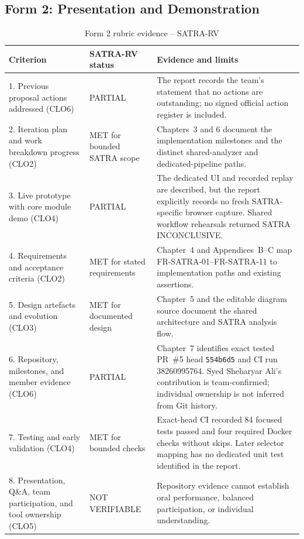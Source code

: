 \subsection{Form 2: Presentation and Demonstration}
\small
\begin{longtable}{p{}p{}p{}}
\caption{Form 2 rubric evidence -- SATRA-RV}\\
\toprule
\textbf{Criterion} & \textbf{SATRA-RV status} & \textbf{Evidence and limits}\\
\midrule
1. Previous proposal actions addressed (CLO6) & PARTIAL & The report records the team's statement that no actions are outstanding; no signed official action register is included.\\
2. Iteration plan and work breakdown progress (CLO2) & MET for bounded SATRA scope & Chapters~3 and 6 document the implementation milestones and the distinct shared-analyzer and dedicated-pipeline paths.\\
3. Live prototype with core module demo (CLO4) & PARTIAL & The dedicated UI and recorded replay are described, but the report explicitly records no fresh SATRA-specific browser capture. Shared workflow rehearsals returned SATRA INCONCLUSIVE.\\
4. Requirements and acceptance criteria (CLO2) & MET for stated requirements & Chapter~4 and Appendices~B--C map FR-SATRA-01--FR-SATRA-11 to implementation paths and existing assertions.\\
5. Design artefacts and evolution (CLO3) & MET for documented design & Chapter~5 and the editable diagram source document the shared architecture and SATRA analysis flow.\\
6. Repository, milestones, and member evidence (CLO6) & PARTIAL & Chapter~7 identifies exact tested PR~\#5 head \texttt{554b6d5} and CI run 38260995764. Syed Sheharyar Ali's contribution is team-confirmed; individual ownership is not inferred from Git history.\\
7. Testing and early validation (CLO4) & MET for bounded checks & Exact-head CI recorded 84 focused tests passed and four required Docker checks without skips. Later selector mapping has no dedicated unit test identified in the report.\\
8. Presentation, Q\&A, team participation, and tool ownership (CLO5) & NOT VERIFIABLE & Repository evidence cannot establish oral performance, balanced participation, or individual understanding.\\
\bottomrule
\end{longtable}
\normalsize

